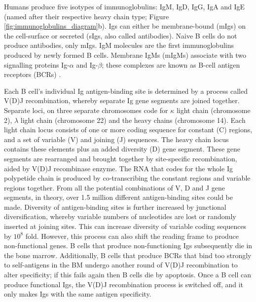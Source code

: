 Humans produce five isotypes of immunoglobulins: IgM, IgD, IgG, IgA and IgE (named after their respective heavy chain type; Figure \ref{fig:immunoglobulins_diagram}b).
Igs can either be membrane-bound (mIgs) on the cell-surface or secreted (sIgs, also called antibodies).
Naive B cells do not produce antibodies, only mIgs.
IgM molecules are the first immunoglobulins produced by newly formed B cells.
Membrane IgMs (mIgMs) associate with two signalling proteins Ig-$\alpha$ and Ig-$\beta$; these complexes are known as B-cell antigen receptors (BCRs) \cite{friess2018structural, dylke2007role}.

Each B cell's individual Ig antigen-binding site is determined by a process called V(D)J recombination, whereby separate Ig gene segments are joined together.
Separate loci, on three separate chromosomes code for $\kappa$ light chain (chromosome 2), $\lambda$ light chain (chromosome 22) and the heavy chains (chromosome 14).
Each light chain locus consists of one or more coding sequence for constant (C) regions, and a set of variable (V) and joining (J) sequences.
The heavy chain locus contains these elements plus an added diversity (D) gene segment.
These gene segments are rearranged and brought together by site-specific recombination, aided by V(D)J recombinase enzyme.
The RNA that codes for the whole Ig polypetide chain is produced by co-transcribing the constant regions and variable regions together.
From all the potential combinations of V, D and J gene segments, in theory, over 1.5 million different antigen-binding sites could be made.
Diversity of antigen-binding sites is further increased by junctional diversification, whereby variable numbers of nucleotides are lost or randomly inserted at joining sites.
This can increase diversity of variable coding sequences by $10^8$ fold.
However, this process can also shift the reading frame to produce non-functional genes.
B cells that produce non-functioning Igs subsequently die in the bone marrow.
Additionally, B cells that produce BCRs that bind too strongly to self-antigens in the BM undergo another round of V(D)J recombination to alter specificity; if this fails again then B cells die by apoptosis.
Once a B cell can produce functional Igs, the V(D)J recombination process is switched off, and it only makes Igs with the same antigen specificity.

